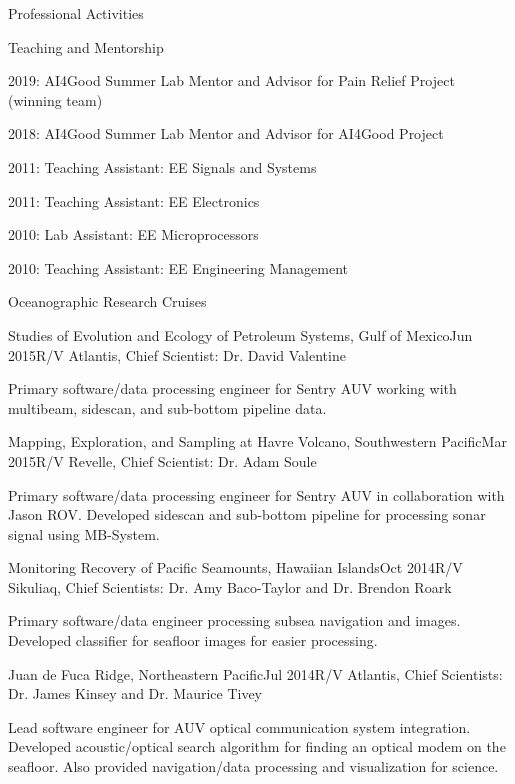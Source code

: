 \documentclass{resume} %
\begin{document}
\begin{rSection}{Professional Activities}
\begin{rSubsection}{Teaching and Mentorship}{}{}{}
\item{2019: AI4Good Summer Lab Mentor and Advisor for Pain Relief Project (winning team)}
\item{2018: AI4Good Summer Lab Mentor and Advisor for AI4Good Project}
\item{2011: Teaching Assistant: EE Signals and Systems}
\item{2011: Teaching Assistant: EE Electronics}
\item{2010: Lab Assistant: EE Microprocessors}
\item{2010: Teaching Assistant: EE Engineering Management}
\end{rSubsection}
\vspace{-.2cm}
\end{rSection}
\begin{rSection}{Oceanographic Research Cruises}
\begin{rSubsection}{Studies of Evolution and Ecology of Petroleum Systems, Gulf of Mexico}{Jun 2015}{R/V Atlantis, Chief Scientist: Dr. David Valentine}{}
\item{Primary software/data processing engineer for Sentry AUV working with multibeam, sidescan, and sub-bottom pipeline data.}
\end{rSubsection}
\begin{rSubsection}{Mapping, Exploration, and Sampling at Havre Volcano, Southwestern Pacific}{Mar 2015}{R/V Revelle, Chief Scientist: Dr. Adam Soule}{}
\item{Primary software/data processing engineer for Sentry AUV in collaboration with Jason ROV. Developed sidescan and sub-bottom pipeline for processing sonar signal using MB-System.}
\end{rSubsection}
\begin{rSubsection}{Monitoring Recovery of Pacific Seamounts, Hawaiian Islands}{Oct 2014}{R/V Sikuliaq, Chief Scientists: Dr. Amy Baco-Taylor and Dr. Brendon Roark}{}
\item{Primary software/data engineer processing subsea navigation and images. Developed classifier for seafloor images for easier processing.}
\end{rSubsection}
\begin{rSubsection}{Juan de Fuca Ridge, Northeastern Pacific}{Jul 2014}{R/V Atlantis, Chief Scientists: Dr. James Kinsey and Dr. Maurice Tivey}{}
\item{Lead software engineer for AUV optical communication system integration. Developed acoustic/optical search algorithm for finding an optical modem on the seafloor. Also provided navigation/data processing and visualization for science.}

\end{rSubsection}
\end{rSection}
\end{document}
